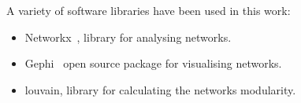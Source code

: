 \documentclass{article}
\theoremstyle{definition}
\begin{document}
A variety of software libraries have been used in this work:

\begin{itemize}
    \item Networkx~\cite{networkx}, library for analysing networks.
    \item Gephi~\cite{ICWSM09154} open source package for visualising networks.
    \item louvain, library for calculating the networks modularity.
\end{itemize}

\newpage


\end{document}
